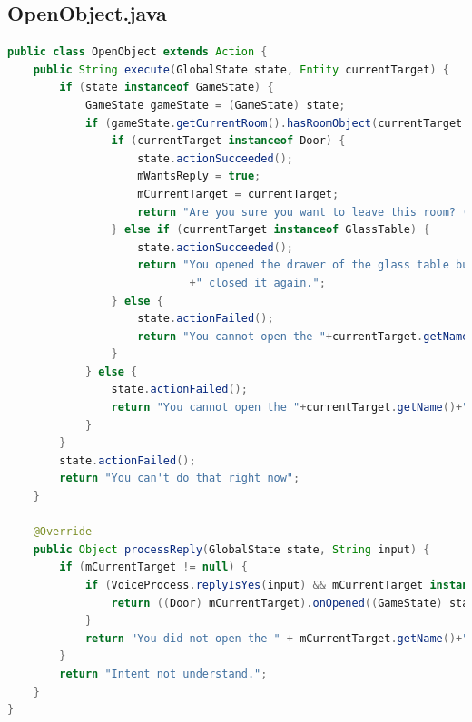 \documentclass[11pt]{article}
\begin{document}
\newpage
\subsection{OpenObject.java}
\label{appendix:open-object}
\begin{lstlisting}[language=Java]
public class OpenObject extends Action {
    public String execute(GlobalState state, Entity currentTarget) {
        if (state instanceof GameState) {
            GameState gameState = (GameState) state;
            if (gameState.getCurrentRoom().hasRoomObject(currentTarget.getName())) {
                if (currentTarget instanceof Door) {
                    state.actionSucceeded();
                    mWantsReply = true;
                    mCurrentTarget = currentTarget;
                    return "Are you sure you want to leave this room? (yes/no)";
                } else if (currentTarget instanceof GlassTable) {
                    state.actionSucceeded();
                    return "You opened the drawer of the glass table but nothing is inside. You"
                            +" closed it again.";
                } else {
                    state.actionFailed();
                    return "You cannot open the "+currentTarget.getName()+".";
                }
            } else {
                state.actionFailed();
                return "You cannot open the "+currentTarget.getName()+".";
            }
        }
        state.actionFailed();
        return "You can't do that right now";
    }

    @Override
    public Object processReply(GlobalState state, String input) {
        if (mCurrentTarget != null) {
            if (VoiceProcess.replyIsYes(input) && mCurrentTarget instanceof Door) {
                return ((Door) mCurrentTarget).onOpened((GameState) state);
            }
            return "You did not open the " + mCurrentTarget.getName()+".";
        }
        return "Intent not understand.";
    }
}

\end{lstlisting}

\newpage
\end{document}
